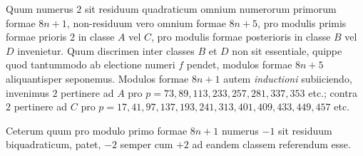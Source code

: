Quum numerus $2$ sit residuum quadraticum omnium numerorum primorum formae $8n+1$, non-residuum vero omnium formae $8n+5$, pro modulis primis formae prioris $2$ in classe $A$ vel $C$, pro modulis formae posterioris in classe $B$ vel $D$ invenietur. Quum discrimen inter classes $B$ et $D$ non sit essentiale, quippe quod tantummodo ab electione numeri $f$ pendet, modulos formae $8n+5$ aliquantisper seponemus. Modulos formae $8n+1$ autem \emph{inductioni} subiiciendo, invenimus $2$ pertinere ad $A$ pro $p=73,89,113,233,257,281,337,353$ etc.; contra $2$ pertinere ad $C$ pro $p=17,41,97,137,193,241,313,401,409,433,449,457$ etc.

Ceterum quum pro modulo primo formae $8n+1$ numerus $-1$ sit residuum biquadraticum, patet, $-2$ semper cum $+2$ ad eandem classem referendum esse.

